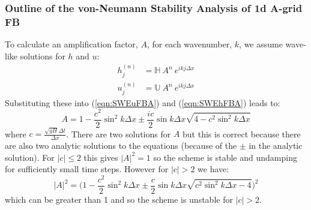 
\clearpage{}


\subsubsection*{Outline of the von-Neumann Stability Analysis of 1d A-grid FB}

To calculate an amplification factor, $A$, for each wavenumber, $k$,
we assume wave-like solutions for $h$ and $u$: 
\begin{align}
h_{j}^{(n)} & =\mathbb{H}~A^{n}~e^{ikj\Delta x}\\
u_{j}^{(n)} & =\mathbb{U}~A^{n}~e^{ikj\Delta x}
\end{align}
Substituting these into (\ref{eqn:SWEuFBA}) and (\ref{eqn:SWEhFBA})
leads to: 
\begin{equation}
A=1-\frac{c^{2}}{2}\sin^{2}k\Delta x\pm\frac{ic}{2}\sin k\Delta x\sqrt{4-c^{2}\sin^{2}k\Delta x}
\end{equation}
where $c=\frac{\sqrt{gH}\Delta t}{\Delta x}$. There are two solutions
for $A$ but this is correct because there are also two analytic solutions
to the equations (because of the $\pm$ in the analytic solution).
For $|c|\le2$ this gives $|A|^{2}=1$ so the scheme is stable and
undamping for sufficiently small time steps. However for $|c|>2$
we have: 
\[
|A|^{2}=\biggl(1-\frac{c^{2}}{2}\sin^{2}k\Delta x\pm\frac{c}{2}\sin k\Delta x\sqrt{c^{2}\sin^{2}k\Delta x-4}\biggr)^{2}
\]
which can be greater than 1 and so the scheme is unstable for $|c|>2$.

